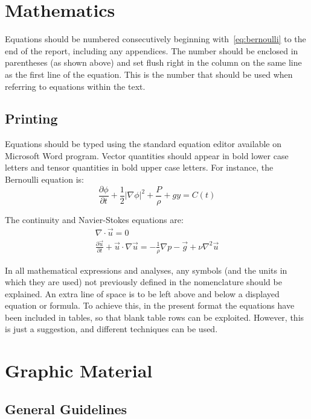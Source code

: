 \documentclass[bibtex,pagenumbers]{stabs2021}
\begin{document}
\section{Mathematics}

Equations should be numbered consecutively beginning
with~\eqref{eq:bernoulli} to the end of the report, including any
appendices. The number should be enclosed in parentheses (as shown
above) and set flush right in the column on the same line as the first
line of the equation. This is the number that should be used when
referring to equations within the text.

\subsection{Printing}

Equations should be typed using the standard equation editor available
on Microsoft Word program. Vector quantities should appear in bold
lower case letters and tensor quantities in bold upper case letters.
For instance, the Bernoulli equation is:
\begin{equation}
  \label{eq:bernoulli}
  \frac{\partial\phi}{\partial t}
  + \frac{1}{2} \lvert \nabla \phi \rvert^2 + \frac{P}{\rho} + g y
  = C(t)
\end{equation}

The continuity and Navier-Stokes equations are:
\begin{gather}
  \nabla \cdot \vec{u} = 0 \\
  \frac{\partial \vec{u}}{\partial t} + \vec{u} \cdot \nabla \vec{u}
  = -\frac{1}{\rho} \nabla p - \vec{g} + \nu \nabla^2 \vec{u}
\end{gather}

In all mathematical expressions and analyses, any symbols (and the
units in which they are used) not previously defined in the
nomenclature should be explained. An extra line of space is to be left
above and below a displayed equation or formula. To achieve this, in
the present format the equations have been included in tables, so that
blank table rows can be exploited. However, this is just a suggestion,
and different techniques can be used.

\section{Graphic Material}

\subsection{General Guidelines}
\end{document}
